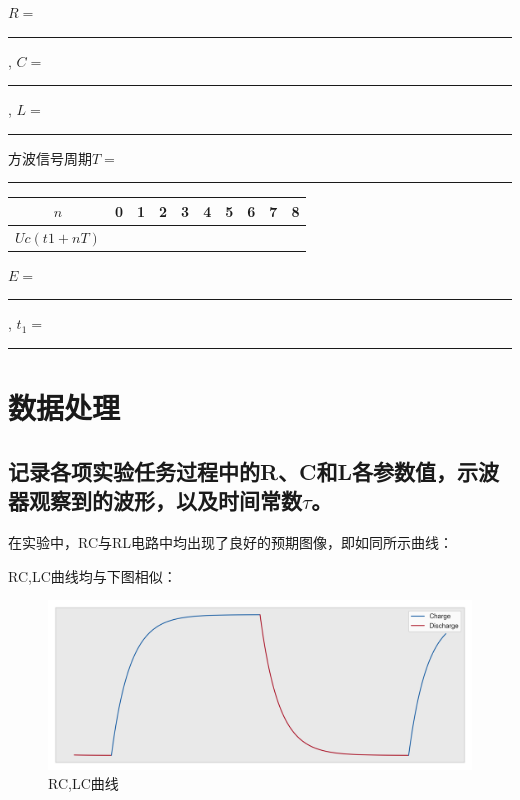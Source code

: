 \documentclass{ctexart}
\begin{document}
$R = $\rule{2cm}{0.5pt},  $C = $\rule{2cm}{0.5pt}, $L = $\rule{2cm}{0.5pt}

方波信号周期$T = $\rule{2cm}{0.5pt}

\begin{table}[!htbp]
    \centering
    \begin{tabular}{|c|p{2em}|p{2em}|p{2em}|p{2em}|p{2em}|p{2em}|p{2em}|p{2em}|p{2em}|}
    \hline
    $n$ & 0 & 1 & 2 & 3 & 4 & 5 & 6 & 7 & 8 \\
    \hline
    $Uc(t1+nT)$ & & & & & & & & & \\
    \hline
    \end{tabular}
\end{table}

$E = $\rule{2cm}{0.5pt},  $t_1 = $\rule{2cm}{0.5pt}

\newpage

\section{数据处理}

\subsection{记录各项实验任务过程中的R、C和L各参数值，示波器观察到的波形，以及时间常数$\tau$。}

在实验中，RC与RL电路中均出现了良好的预期图像，即如同所示曲线：

RC,LC曲线均与下图相似：
\begin{figure}[h]
    \centering
    \includegraphics[width=.9\textwidth]{pic.png} %
    \caption{RC,LC曲线}
    \label{fig: rclc-pic}
\end{figure}
\end{document}
